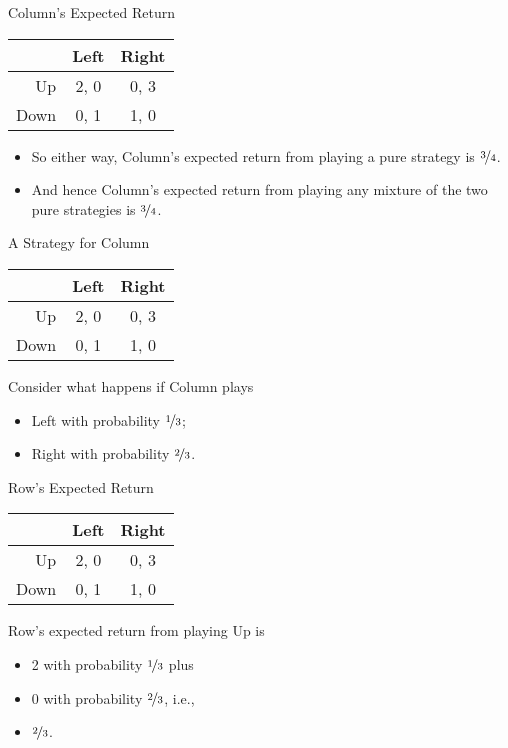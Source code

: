 \documentclass[
  ignorenonframetext,
]{beamer}
\providecommand{\tightlist}{%
  \setlength{\itemsep}{0pt}\setlength{\parskip}{0pt}}
\begin{document}
\begin{frame}{Column's Expected Return}
\protect\hypertarget{columns-expected-return-2}{}
\begin{table}[!h]
\centering
\begin{tabular}[t]{>{}r|cc}
\toprule
 & Left & Right\\
\midrule
Up & 2, 0 & 0, 3\\
Down & 0, 1 & 1, 0\\
\bottomrule
\end{tabular}
\end{table}

\begin{itemize}
\tightlist
\item
  So either way, Column's expected return from playing a pure strategy
  is \(\nicefrac{3}{4}\).
\item
  And hence Column's expected return from playing any mixture of the two
  pure strategies is \(\nicefrac{3}{4}\).
\end{itemize}
\end{frame}

\begin{frame}{A Strategy for Column}
\protect\hypertarget{a-strategy-for-column}{}
\begin{table}[!h]
\centering
\begin{tabular}[t]{>{}r|cc}
\toprule
 & Left & Right\\
\midrule
Up & 2, 0 & 0, 3\\
Down & 0, 1 & 1, 0\\
\bottomrule
\end{tabular}
\end{table}

Consider what happens if Column plays

\begin{itemize}
\tightlist
\item
  Left with probability \(\nicefrac{1}{3}\);
\item
  Right with probability \(\nicefrac{2}{3}\).
\end{itemize}
\end{frame}

\begin{frame}{Row's Expected Return}
\protect\hypertarget{rows-expected-return}{}
\begin{table}[!h]
\centering
\begin{tabular}[t]{>{}r|cc}
\toprule
 & Left & Right\\
\midrule
Up & 2, 0 & 0, 3\\
Down & 0, 1 & 1, 0\\
\bottomrule
\end{tabular}
\end{table}

Row's expected return from playing Up is

\begin{itemize}
\tightlist
\item
  2 with probability \(\nicefrac{1}{3}\) plus
\item
  0 with probability \(\nicefrac{2}{3}\), i.e.,
\item
  \(\nicefrac{2}{3}\).
\end{itemize}
\end{frame}
\end{document}
